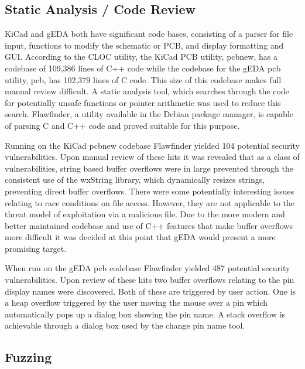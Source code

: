 \documentclass[12pt]{article}
\begin{document}
\subsection{Static Analysis / Code Review}
KiCad and gEDA both have significant code bases, consisting of a parser for file input, functions to modify the schematic or PCB, and display formatting and GUI. According to the CLOC utility, the KiCad PCB utility, pcbnew, has a codebase of 109,386 lines of C++ code while the codebase for the gEDA pcb utility, pcb, has 102,379 lines of C code. This size of this codebase makes full manual review difficult. A static analysis tool, which searches through the code for potentially unsafe functions or pointer arithmetic was used to reduce this search. Flawfinder, a utility available in the Debian package manager, is capable of parsing C and C++ code and proved suitable for this purpose. 

Running on the KiCad pcbnew codebase Flawfinder yielded 104 potential security vulnerabilities. Upon manual review of these hits it was revealed that as a class of vulnerabilities, string based buffer overflows were in large prevented through the consistent use of the wxString library, which dynamically resizes strings, preventing direct buffer overflows. There were some potentially interesting issues relating to race conditions on file access. However, they are not applicable to the threat model of exploitation via a malicious file. Due to the more modern and better maintained codebase and use of C++ features that make buffer overflows more difficult it was decided at this point that gEDA would present a more promising target. 

When run on the gEDA pcb codebase Flawfinder yielded 487 potential security vulnerabilities. Upon review of these hits two buffer overflows relating to the pin display names were discovered. Both of these are triggered by user action. One is a heap overflow triggered by the user moving the mouse over a pin which automatically pops up a dialog box showing the pin name. A stack overflow is achievable through a dialog box used by the change pin name tool.

\subsection{Fuzzing}
\end{document}
